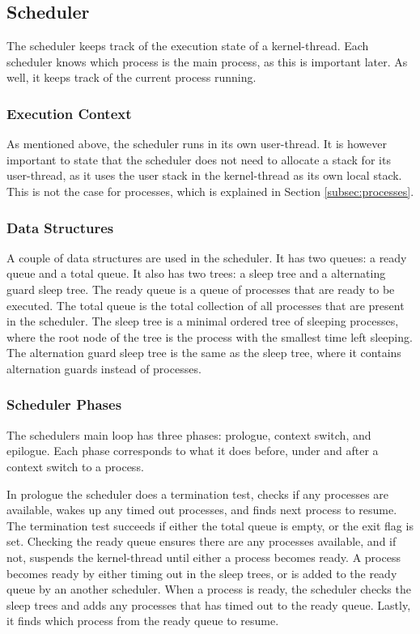 \subsection{Scheduler}
\label{sec:scheduler}

The scheduler keeps track of the execution state of a kernel\hyp{}thread. Each scheduler knows which process is the main process, as this is important later. As well, it keeps track of the current process running. 

\subsubsection*{Execution Context}

As mentioned above, the scheduler runs in its own user\hyp{}thread. It is however important to state that the scheduler does not need to allocate a stack for its user\hyp{}thread, as it uses the user stack in the kernel\hyp{}thread as its own local stack. This is not the case for processes, which is explained in Section \ref{subsec:processes}.

\subsubsection*{Data Structures}

A couple of data structures are used in the scheduler. It has two queues: a ready queue and a total queue. It also has two trees: a sleep tree and a alternating guard sleep tree. The ready queue is a queue of processes that are ready to be executed. The total queue is the total collection of all processes that are present in the scheduler. The sleep tree is a minimal ordered tree of sleeping processes, where the root node of the tree is the process with the smallest time left sleeping. The alternation guard sleep tree is the same as the sleep tree, where it contains alternation guards instead of processes.

\subsubsection*{Scheduler Phases}

The schedulers main loop has three phases: prologue, context switch, and epilogue. Each phase corresponds to what it does before, under and after a context switch to a process. 

In prologue the scheduler does a termination test, checks if any processes are available, wakes up any timed out processes, and finds next process to resume. The termination test succeeds if either the total queue is empty, or the exit flag is set. Checking the ready queue ensures there are any processes available, and if not, suspends the kernel\hyp{}thread until either a process becomes ready. A process becomes ready by either timing out in the sleep trees, or is added to the ready queue by an another scheduler. When a process is ready, the scheduler checks the sleep trees and adds any processes that has timed out to the ready queue. Lastly, it finds which process from the ready queue to resume.

